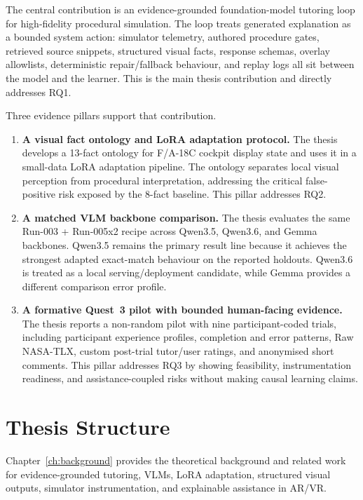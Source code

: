 The central contribution is an evidence-grounded foundation-model tutoring loop
for high-fidelity procedural simulation. The loop treats generated explanation
as a bounded system action: simulator telemetry, authored procedure gates,
retrieved source snippets, structured visual facts, response schemas, overlay
allowlists, deterministic repair/fallback behaviour, and replay logs all sit
between the model and the learner. This is the main thesis contribution and
directly addresses RQ1.

Three evidence pillars support that contribution.

\begin{enumerate}
\item \textbf{A visual fact ontology and LoRA adaptation protocol.}
The thesis develops a 13-fact ontology for F/A-18C cockpit display state and
uses it in a small-data LoRA adaptation pipeline. The ontology separates local
visual perception from procedural interpretation, addressing the critical
false-positive risk exposed by the 8-fact baseline. This pillar addresses RQ2.

\item \textbf{A matched VLM backbone comparison.}
The thesis evaluates the same Run-003 + Run-005x2 recipe across Qwen3.5,
Qwen3.6, and Gemma backbones. Qwen3.5 remains the primary result line because
it achieves the strongest adapted exact-match behaviour on the reported
holdouts. Qwen3.6 is treated as a local serving/deployment candidate, while
Gemma provides a different comparison error profile.

\item \textbf{A formative Quest~3 pilot with bounded human-facing evidence.}
The thesis reports a non-random pilot with nine participant-coded trials,
including participant experience profiles, completion and error patterns, Raw
NASA-TLX, custom post-trial tutor/user ratings, and anonymised short comments.
This pillar addresses RQ3 by showing feasibility, instrumentation readiness,
and assistance-coupled risks without making causal learning claims.
\end{enumerate}

\section{Thesis Structure}\label{sec:intro-structure}

Chapter~\ref{ch:background} provides the theoretical background and related
work for evidence-grounded tutoring, VLMs, LoRA adaptation, structured visual
outputs, simulator instrumentation, and explainable assistance in AR/VR.

